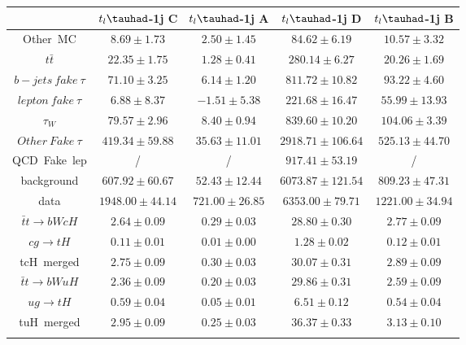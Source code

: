 \centering
\begin{tabular}{ccccc} \toprule\toprule
 & $t_{l}\tauhad$-1j C & $t_{l}\tauhad$-1j A & $t_{l}\tauhad$-1j D & $t_{l}\tauhad$-1j B\\\midrule
Other~MC & $8.69\pm1.73$ & $2.50\pm1.45$ & $84.62\pm6.19$ & $10.57\pm3.32$\\
$t\bar{t}$ & $22.35\pm1.75$ & $1.28\pm0.41$ & $280.14\pm6.27$ & $20.26\pm1.69$\\
$b-jets~fake~\tau$ & $71.10\pm3.25$ & $6.14\pm1.20$ & $811.72\pm10.82$ & $93.22\pm4.60$\\
$lepton~fake~\tau$ & $6.88\pm8.37$ & $-1.51\pm5.38$ & $221.68\pm16.47$ & $55.99\pm13.93$\\
$\tau_{W}$ & $79.57\pm2.96$ & $8.40\pm0.94$ & $839.60\pm10.20$ & $104.06\pm3.39$\\
$Other~Fake~\tau$ & $419.34\pm59.88$ & $35.63\pm11.01$ & $2918.71\pm106.64$ & $525.13\pm44.70$\\
QCD~Fake~lep &  / &  / & $917.41\pm53.19$ &  /\\
background & $607.92\pm60.67$ & $52.43\pm12.44$ & $6073.87\pm121.54$ & $809.23\pm47.31$\\
data & $1948.00\pm44.14$ & $721.00\pm26.85$ & $6353.00\pm79.71$ & $1221.00\pm34.94$\\
$\bar{t}t\to bWcH$ & $2.64\pm0.09$ & $0.29\pm0.03$ & $28.80\pm0.30$ & $2.77\pm0.09$\\
$cg\to tH$ & $0.11\pm0.01$ & $0.01\pm0.00$ & $1.28\pm0.02$ & $0.12\pm0.01$\\
tcH~merged & $2.75\pm0.09$ & $0.30\pm0.03$ & $30.07\pm0.31$ & $2.89\pm0.09$\\
$\bar{t}t\to bWuH$ & $2.36\pm0.09$ & $0.20\pm0.03$ & $29.86\pm0.31$ & $2.59\pm0.09$\\
$ug\to tH$ & $0.59\pm0.04$ & $0.05\pm0.01$ & $6.51\pm0.12$ & $0.54\pm0.04$\\
tuH~merged & $2.95\pm0.09$ & $0.25\pm0.03$ & $36.37\pm0.33$ & $3.13\pm0.10$\\
\bottomrule\bottomrule\\
\end{tabular}
